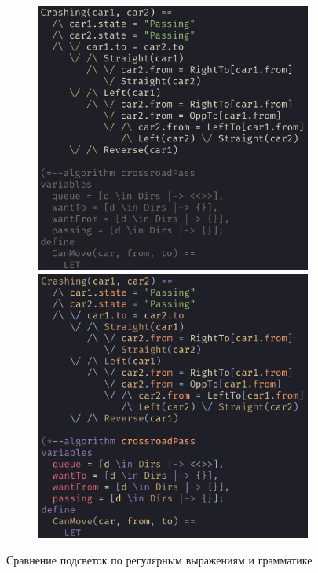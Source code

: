 \documentclass[14pt, openany]{report}
\begin{document}
\begin{figure}[h]
  \centering
  \begin{subfigure}{\linewidth}
    \includegraphics[scale=0.2]{regexHighlight}\hfill
    \includegraphics[scale=0.2]{grammarHighlight}
  \end{subfigure}
  \label{fig:highlightingComp}
  \caption{Сравнение подсветок по регулярным выражениям и грамматике}
\end{figure}
\end{document}
